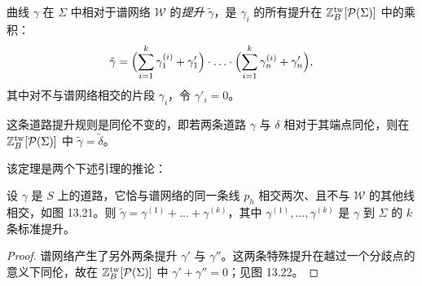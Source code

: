 
\begin{definition}[13.28]
曲线 $\gamma$ 在 $\Sigma$ 中相对于谱网络 $\mathcal{W}$ 的\emph{提升} $\tilde\gamma$，是 $\gamma_i$ 的所有提升在 $\mathbb{Z}^{\mathrm{tw}}_B[\mathcal{P}(\Sigma)]$ 中的乘积：
\[
\tilde\gamma=\Bigl(\sum_{i=1}^{k}\gamma_1^{(i)}+\gamma'_1\Bigr)\cdot\ldots\cdot\Bigl(\sum_{i=1}^{k}\gamma_n^{(i)}+\gamma'_n\Bigr),
\]
其中对不与谱网络相交的片段 $\gamma_i$，令 $\gamma'_i=0$。
\end{definition}


\begin{theorem}[13.29]
这条道路提升规则是同伦不变的，即若两条道路 $\gamma$ 与 $\delta$ 相对于其端点同伦，则在 $\mathbb{Z}^{\mathrm{tw}}_B[\mathcal{P}(\Sigma)]$ 中 $\tilde\gamma=\tilde\delta$。
\end{theorem}

该定理是两个下述引理的推论：

\begin{lemma}[13.30]
设 $\gamma$ 是 $S$ 上的道路，它恰与谱网络的同一条线 $p_h$ 相交两次、且不与 $\mathcal{W}$ 的其他线相交，如图 13.21。则 $\tilde\gamma=\gamma^{(1)}+\dots+\gamma^{(k)}$，其中 $\gamma^{(1)},\dots,\gamma^{(k)}$ 是 $\gamma$ 到 $\Sigma$ 的 $k$ 条标准提升。
\end{lemma}

\begin{proof}
谱网络产生了另外两条提升 $\gamma'$ 与 $\gamma''$。这两条特殊提升在越过一个分歧点的意义下同伦，故在 $\mathbb{Z}^{\mathrm{tw}}_B[\mathcal{P}(\Sigma)]$ 中 $\gamma'+\gamma''=0$；见图 13.22。
\end{proof}




